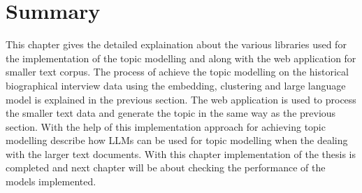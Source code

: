 \section{Summary}
This chapter gives the detailed explaination about the various libraries used for the implementation of the topic modelling and along with the web application for 
smaller text corpus. The process of achieve the topic modelling on the historical biographical interview data using the embedding, clustering and large language 
model is explained in the previous section. The web application is used to process the smaller text data and generate the topic in the same way as the previous section.
With the help of this implementation approach for achieving topic modelling describe how LLMs can be used for topic modelling when the dealing with the larger text documents.
With this chapter implementation of the thesis is completed and next chapter will be about checking the performance of the models implemented.


